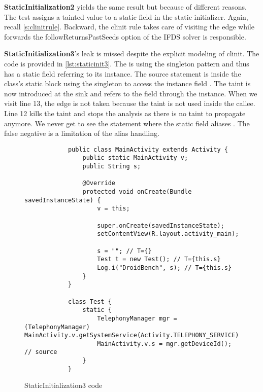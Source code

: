 \documentclass[../draft.tex]{subfiles}
\begin{document}
    \textbf{StaticInitialization2} yields the same result but because of different reasons. The test assigns a tainted value to a static field in the static initializer. Again, recall \autoref{s:clinitrule}. Backward, the clinit rule takes care of visiting the  edge while forwards the followReturnsPastSeeds option of the IFDS solver is responsible.

    \textbf{StaticInitialization3}'s leak is missed despite the explicit modeling of clinit. The code is provided in \autoref{lst:staticinit3}. The  is using the singleton pattern and thus has a static field  referring to its instance. The source statement is inside the  class's static block using the singleton to access the instance field .
    The taint is now introduced at the sink and refers to the field through the  instance. When we visit line 13, the  edge is not taken because the taint is not used inside the callee. 
    Line 12 kills the taint and stops the analysis as there is no taint to propagate anymore. 
    We never get to see the statement where the static field  aliases .
    The false negative is a limitation of the alias handling.

    \begin{figure}[tbp]
        \begin{lstlisting}
            public class MainActivity extends Activity {
                public static MainActivity v;
                public String s;

                @Override
                protected void onCreate(Bundle savedInstanceState) {
                    v = this;

                    super.onCreate(savedInstanceState);
                    setContentView(R.layout.activity_main);

                    s = ""; // T={}
                    Test t = new Test(); // T={this.s}
                    Log.i("DroidBench", s); // T={this.s}
                }
            }

            class Test {
                static {
                    TelephonyManager mgr = (TelephonyManager) MainActivity.v.getSystemService(Activity.TELEPHONY_SERVICE);
                    MainActivity.v.s = mgr.getDeviceId(); // source
                }
            }
        \end{lstlisting}
        \caption{StaticInitialization3 code}
        \label{lst:staticinit3}
    \end{figure}
\end{document}
